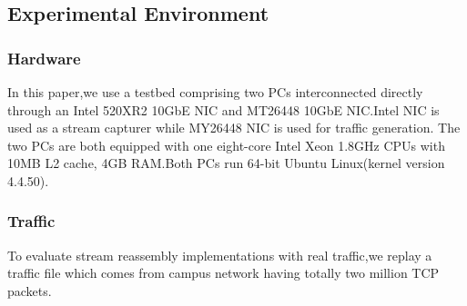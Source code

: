 \documentclass[conference]{IEEEtran}
\begin{document}
\subsection{Experimental Environment}

\subsubsection{Hardware}
In this paper,we use a testbed comprising two PCs interconnected directly through an Intel 520XR2 10GbE NIC and MT26448 10GbE NIC.Intel NIC is used as a stream capturer while MY26448 NIC is used for traffic generation. The two PCs are both equipped with one eight-core Intel Xeon 1.8GHz CPUs with 10MB L2 cache, 4GB RAM.Both PCs run 64-bit Ubuntu Linux(kernel version 4.4.50).
\subsubsection{Traffic}
To evaluate stream reassembly implementations with real traffic,we replay a traffic file which comes from campus network having totally two million TCP packets.
\end{document}
